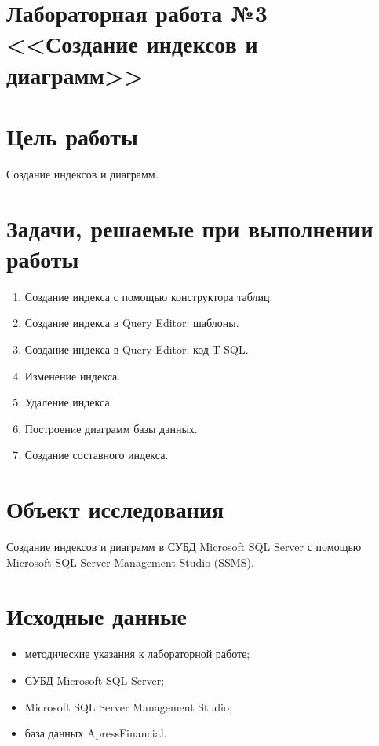 \documentclass[a4paper, 14pt]{extarticle}
\begin{document}
\setcounter{page}{2}

\linespread{1.5}
\renewcommand{\baselinestretch}{1.5}

\section*{\large{Лабораторная работа №3 <<Создание индексов и диаграмм>>}}

\section{Цель работы}

Создание индексов и диаграмм.

\section{Задачи, решаемые при выполнении работы}

\begin{enumerate}[leftmargin=*]
  \item Создание индекса с помощью конструктора таблиц.
  \item Создание индекса в Query Editor: шаблоны.
  \item Создание индекса в Query Editor: код T-SQL.
  \item Изменение индекса.
  \item Удаление индекса.
  \item Построение диаграмм базы данных.
  \item Создание составного индекса.
\end{enumerate}

\section{Объект исследования}

Создание индексов и диаграмм в СУБД \foreignlanguage{english}{Microsoft SQL
Server} с помощью \foreignlanguage{english}{Microsoft SQL Server Management
Studio (SSMS)}.

\section{Исходные данные}

\begin{itemize}
  \item методические указания к лабораторной работе;
  \item СУБД Microsoft SQL Server;
  \item Microsoft SQL Server Management Studio;
  \item база данных ApressFinancial.
\end{itemize}
\end{document}
